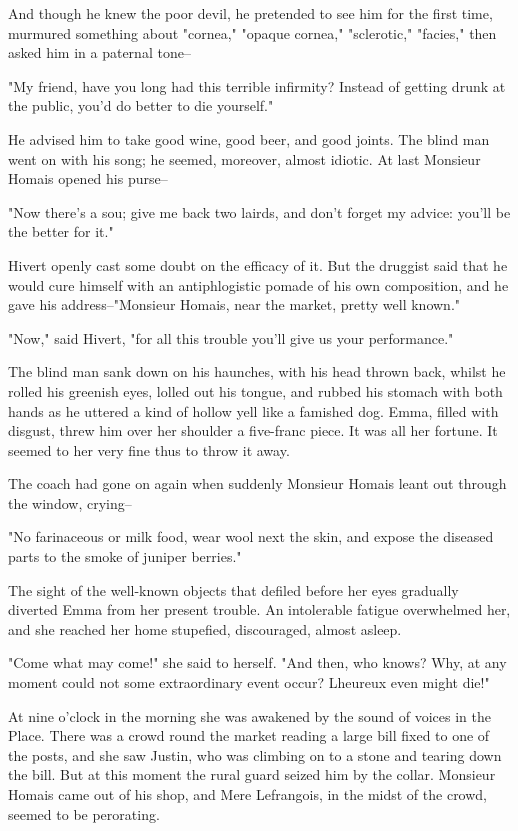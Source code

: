 \documentclass[11pt,twocolumn]{ltugboat}
\begin{document}
And though he knew the poor devil, he pretended to see him for the first
time, murmured something about "cornea," "opaque cornea," "sclerotic,"
"facies," then asked him in a paternal tone--

"My friend, have you long had this terrible infirmity? Instead of
getting drunk at the public, you'd do better to die yourself."

He advised him to take good wine, good beer, and good joints. The blind
man went on with his song; he seemed, moreover, almost idiotic. At last
Monsieur Homais opened his purse--

"Now there's a sou; give me back two lairds, and don't forget my advice:
you'll be the better for it."

Hivert openly cast some doubt on the efficacy of it. But the druggist
said that he would cure himself with an antiphlogistic pomade of his own
composition, and he gave his address--"Monsieur Homais, near the market,
pretty well known."

"Now," said Hivert, "for all this trouble you'll give us your
performance."

The blind man sank down on his haunches, with his head thrown back,
whilst he rolled his greenish eyes, lolled out his tongue, and rubbed
his stomach with both hands as he uttered a kind of hollow yell like a
famished dog. Emma, filled with disgust, threw him over her shoulder
a five-franc piece. It was all her fortune. It seemed to her very fine
thus to throw it away.

The coach had gone on again when suddenly Monsieur Homais leant out
through the window, crying--

"No farinaceous or milk food, wear wool next the skin, and expose the
diseased parts to the smoke of juniper berries."

The sight of the well-known objects that defiled before her eyes
gradually diverted Emma from her present trouble. An intolerable fatigue
overwhelmed her, and she reached her home stupefied, discouraged, almost
asleep.

"Come what may come!" she said to herself. "And then, who knows? Why, at
any moment could not some extraordinary event occur? Lheureux even might
die!"

At nine o'clock in the morning she was awakened by the sound of voices
in the Place. There was a crowd round the market reading a large bill
fixed to one of the posts, and she saw Justin, who was climbing on to
a stone and tearing down the bill. But at this moment the rural guard
seized him by the collar. Monsieur Homais came out of his shop, and Mere
Lefrangois, in the midst of the crowd, seemed to be perorating.
\end{document}
